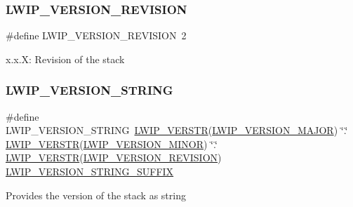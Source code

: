 \subsubsection{\texorpdfstring{L\+W\+I\+P\+\_\+\+V\+E\+R\+S\+I\+O\+N\+\_\+\+R\+E\+V\+I\+S\+I\+ON}{LWIP\_VERSION\_REVISION}\hspace{0.1cm}{\footnotesize\ttfamily [2/2]}}
{\footnotesize\ttfamily \#define L\+W\+I\+P\+\_\+\+V\+E\+R\+S\+I\+O\+N\+\_\+\+R\+E\+V\+I\+S\+I\+ON~2}

x.\+x.\+X\+: Revision of the stack \mbox{\label{group__lwip__version_gab47e87bc38eef94486db402813183ba7}} 
\subsubsection{\texorpdfstring{L\+W\+I\+P\+\_\+\+V\+E\+R\+S\+I\+O\+N\+\_\+\+S\+T\+R\+I\+NG}{LWIP\_VERSION\_STRING}\hspace{0.1cm}{\footnotesize\ttfamily [1/2]}}
{\footnotesize\ttfamily \#define L\+W\+I\+P\+\_\+\+V\+E\+R\+S\+I\+O\+N\+\_\+\+S\+T\+R\+I\+NG~\hyperlink{group__lwip__version_ga6dcc57b1d685cae569b2c9c9461de0e2}{L\+W\+I\+P\+\_\+\+V\+E\+R\+S\+TR}(\hyperlink{group__lwip__version_ga4308c06ef36496e00c798d96d7d03246}{L\+W\+I\+P\+\_\+\+V\+E\+R\+S\+I\+O\+N\+\_\+\+M\+A\+J\+OR}) \char`\"{}.\char`\"{} \hyperlink{group__lwip__version_ga6dcc57b1d685cae569b2c9c9461de0e2}{L\+W\+I\+P\+\_\+\+V\+E\+R\+S\+TR}(\hyperlink{group__lwip__version_ga1e596388c15ba81e753c5633fad1c034}{L\+W\+I\+P\+\_\+\+V\+E\+R\+S\+I\+O\+N\+\_\+\+M\+I\+N\+OR}) \char`\"{}.\char`\"{} \hyperlink{group__lwip__version_ga6dcc57b1d685cae569b2c9c9461de0e2}{L\+W\+I\+P\+\_\+\+V\+E\+R\+S\+TR}(\hyperlink{group__lwip__version_ga0a57983df1b199cf39a2e6a2d90e3d50}{L\+W\+I\+P\+\_\+\+V\+E\+R\+S\+I\+O\+N\+\_\+\+R\+E\+V\+I\+S\+I\+ON}) \hyperlink{group__lwip__version_ga548fd1ff32bddf18074d284b794a3983}{L\+W\+I\+P\+\_\+\+V\+E\+R\+S\+I\+O\+N\+\_\+\+S\+T\+R\+I\+N\+G\+\_\+\+S\+U\+F\+F\+IX}}

Provides the version of the stack as string \mbox{\label{group__lwip__version_gab47e87bc38eef94486db402813183ba7}} 
